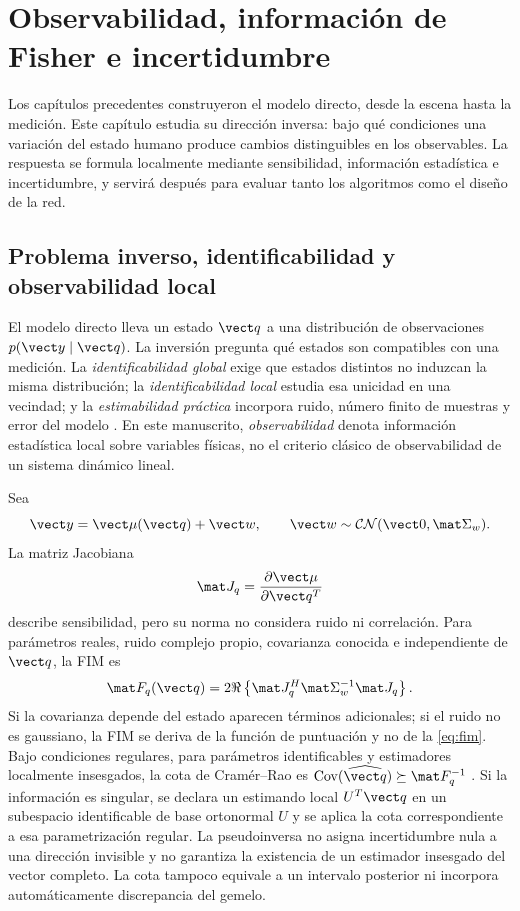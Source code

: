 \chapter{Observabilidad, información de Fisher e incertidumbre}
\label{ch:observability}

Los capítulos precedentes construyeron el modelo directo, desde la escena hasta la
medición. Este capítulo estudia su dirección inversa: bajo qué condiciones una variación
del estado humano produce cambios distinguibles en los observables. La respuesta se
formula localmente mediante sensibilidad, información estadística e incertidumbre, y
servirá después para evaluar tanto los algoritmos como el diseño de la red.

\section{Problema inverso, identificabilidad y observabilidad local}

El modelo directo lleva un estado $\vect q$ a una distribución de observaciones $p(\vect y\mid\vect q)$. La inversión pregunta qué estados son compatibles con una medición. La \emph{identificabilidad global} exige que estados distintos no induzcan la misma distribución; la \emph{identificabilidad local} estudia esa unicidad en una vecindad; y la \emph{estimabilidad práctica} incorpora ruido, número finito de muestras y error del modelo \citep{KaipioSomersalo2005,Kay1993}. En este manuscrito, \emph{observabilidad} denota información estadística local sobre variables físicas, no el criterio clásico de observabilidad de un sistema dinámico lineal.

Sea
\begin{equation}
\vect y=\vect\mu(\vect q)+\vect w,
\qquad
\vect w\sim\mathcal{CN}(\vect 0,\mat\Sigma_w).
\label{eq:local_observation}
\end{equation}
La matriz Jacobiana
\begin{equation}
\mat J_q=\frac{\partial\vect\mu}{\partial\vect q^T}
\label{eq:state_jacobian}
\end{equation}
describe sensibilidad, pero su norma no considera ruido ni correlación. Para parámetros reales, ruido complejo propio, covarianza conocida e independiente de $\vect q$, la \ac{FIM} es
\begin{equation}
\mat F_q(\vect q)
=2\Re\left\{
\mat J_q^H\mat\Sigma_w^{-1}\mat J_q
\right\}.
\label{eq:fim}
\end{equation}
Si la covarianza depende del estado aparecen términos adicionales; si el ruido no es gaussiano, la FIM se deriva de la función de puntuación y no de la \cref{eq:fim}. Bajo condiciones regulares, para parámetros identificables y estimadores localmente
insesgados, la cota de Cramér--Rao es
$\operatorname{Cov}(\widehat{\vect q})\succeq\mat F_q^{-1}$
\citep{Kay1993}. Si la información es singular, se declara un estimando local
$U^T\vect q$ en un subespacio identificable de base ortonormal $U$ y se aplica
la cota correspondiente a esa parametrización regular. La pseudoinversa no
asigna incertidumbre nula a una dirección invisible y no garantiza la existencia
de un estimador insesgado del vector completo. La cota tampoco equivale a un
intervalo posterior ni incorpora automáticamente discrepancia del gemelo.

